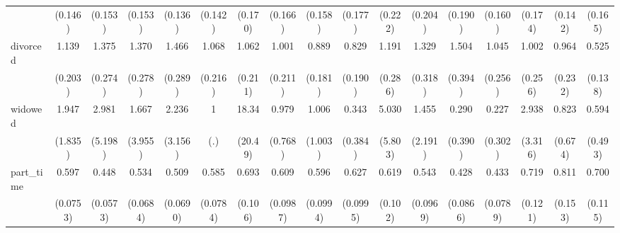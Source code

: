 {\begin{tabular}{l*{16}{c}}
                    &     (0.146)         &     (0.153)         &     (0.153)         &     (0.136)         &     (0.142)         &     (0.170)         &     (0.166)         &     (0.158)         &     (0.177)         &     (0.222)         &     (0.204)         &     (0.190)         &     (0.160)         &     (0.174)         &     (0.142)         &     (0.165)         \\
[1em]
divorced            &       1.139         &       1.375         &       1.370         &       1.466         &       1.068         &       1.062         &       1.001         &       0.889         &       0.829         &       1.191         &       1.329         &       1.504         &       1.045         &       1.002         &       0.964         &       0.525\sym{*}  \\
                    &     (0.203)         &     (0.274)         &     (0.278)         &     (0.289)         &     (0.216)         &     (0.211)         &     (0.211)         &     (0.181)         &     (0.190)         &     (0.286)         &     (0.318)         &     (0.394)         &     (0.256)         &     (0.256)         &     (0.232)         &     (0.138)         \\
[1em]
widowed             &       1.947         &       2.981         &       1.667         &       2.236         &           1         &       18.34\sym{**} &       0.979         &       1.006         &       0.343         &       5.030         &       1.455         &       0.290         &       0.227         &       2.938         &       0.823         &       0.594         \\
                    &     (1.835)         &     (5.198)         &     (3.955)         &     (3.156)         &         (.)         &     (20.49)         &     (0.768)         &     (1.003)         &     (0.384)         &     (5.803)         &     (2.191)         &     (0.390)         &     (0.302)         &     (3.316)         &     (0.674)         &     (0.493)         \\
[1em]
part\_time           &       0.597\sym{***}&       0.448\sym{***}&       0.534\sym{***}&       0.509\sym{***}&       0.585\sym{***}&       0.693\sym{*}  &       0.609\sym{**} &       0.596\sym{**} &       0.627\sym{**} &       0.619\sym{**} &       0.543\sym{***}&       0.428\sym{***}&       0.433\sym{***}&       0.719         &       0.811         &       0.700\sym{*}  \\
                    &    (0.0753)         &    (0.0573)         &    (0.0684)         &    (0.0690)         &    (0.0784)         &     (0.106)         &    (0.0987)         &    (0.0994)         &    (0.0995)         &     (0.102)         &    (0.0969)         &    (0.0866)         &    (0.0789)         &     (0.121)         &     (0.153)         &     (0.115)         \\

\end{tabular}}
